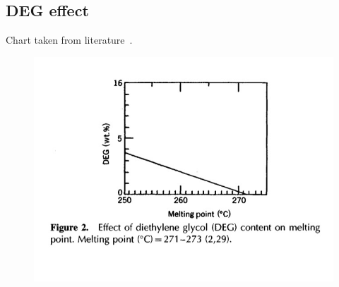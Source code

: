 \documentclass[a4paper, 11pt]{article}
\begin{document}
\begin{appendices}
\newpage

\section{DEG effect}

Chart taken from literature~\cite{handbook}.

\begin{figure}[htp]
\centering
{\includegraphics[scale=0.4]{DEG}} \quad 
\captionsetup{justification=centering}
\end{figure}

\end{appendices}
\end{document}
